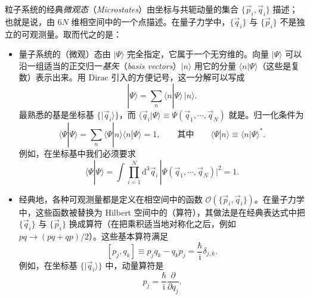 粒子系统的经典\emph{微观态}（\textit{Microstates}）由坐标与共轭动量的集合 $\{\vec p_i,\vec q_i\}$ 描述；也就是说，由 $6N$ 维相空间中的一个点描述。在量子力学中，$\{\vec q_i\}$ 与 $\{\vec p_i\}$ 不是独立的可观测量。取而代之的是：

\begin{itemize}[leftmargin=1.6em,itemsep=0.4em]
\item 量子系统的（微观）态由 $|\Psi\rangle$ 完全指定，它属于一个无穷维的。向量 $|\Psi\rangle$ 可以沿一组适当的正交归一\emph{基矢}（\textit{basis vectors}）$|n\rangle$ 用它的分量 $\langle n|\Psi\rangle$（这些是复数）表示出来。用 Dirac 引入的方便记号，这一分解可以写成
\begin{equation}\label{eq:6.62}
|\Psi\rangle=\sum_n\langle n|\Psi\rangle\,|n\rangle.
\end{equation}
最熟悉的基是坐标基 $\{|\vec q_i\rangle\}$，而 $\langle\vec q_i|\Psi\rangle\equiv\Psi(\vec q_1,\cdots,\vec q_N)$ 就是。归一化条件为
\begin{equation}\label{eq:6.63}
\langle\Psi|\Psi\rangle=\sum_n\langle\Psi|n\rangle\langle n|\Psi\rangle=1,\qquad\text{其中}\qquad\langle\Psi|n\rangle\equiv\langle n|\Psi\rangle^*.
\end{equation}
例如，在坐标基中我们必须要求
\begin{equation}\label{eq:6.64}
\langle\Psi|\Psi\rangle=\int\prod_{i=1}^N\mathrm d^3\vec q_i\,|\Psi(\vec q_1,\cdots,\vec q_N)|^2=1.
\end{equation}

\item 经典地，各种可观测量都是定义在相空间中的函数 $\mathcal O(\{\vec p_i,\vec q_i\})$。在量子力学中，这些函数被替换为 Hilbert 空间中的（算符），其做法是在经典表达式中把 $\{\vec q_i\}$ 与 $\{\vec p_i\}$ 换成算符（在把乘积适当地对称化之后，例如 $pq\to(pq+qp)/2$）。这些基本算符满足
\begin{equation}\label{eq:6.65}
\left[p_j,q_k\right]\equiv p_jq_k-q_kp_j=\frac\hbar{\mathrm i}\delta_{j,k}.
\end{equation}
例如，在坐标基 $\{|\vec q_i\rangle\}$ 中，动量算符是
\begin{equation}\label{eq:6.66}
p_j=\frac\hbar{\mathrm i}\frac{\partial}{\partial q_j}.
\end{equation}


\end{itemize}
